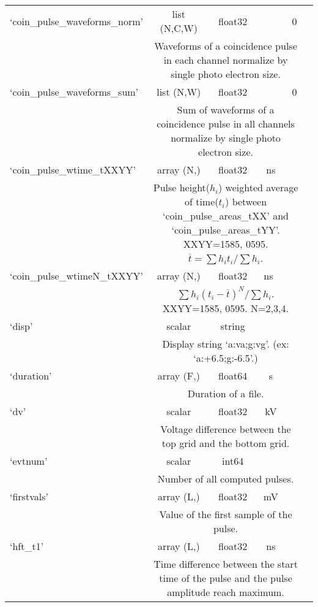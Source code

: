 \begin{center}
\begin{longtable}[!htbp]{|l||*{5}{c|}}
	 	`coin\_pulse\_waveforms\_norm' & list (N,C,W) & float32 &  & 0 \\\cline{2-6} & \multicolumn{4}{m{27em}|}{Waveforms of a coincidence pulse in each channel normalize by single photo electron size.}\\\hline
	 	`coin\_pulse\_waveforms\_sum' & list (N,W) & float32 &  & 0 \\\cline{2-6} & \multicolumn{4}{m{27em}|}{Sum of waveforms of a coincidence pulse in all channels normalize by single photo electron size.}\\\hline
	 	`coin\_pulse\_wtime\_tXXYY' & array (N,) & float32 & \si{\ns} & \si{\nan} \\\cline{2-6} & \multicolumn{4}{m{27em}|}{Pulse height($h_i$) weighted average of time($t_i$) between `coin\_pulse\_areas\_tXX' and `coin\_pulse\_areas\_tYY'. XXYY=1585, 0595. $\overline{t} = \sum h_i t_i /\sum h_i$. }\\\hline 
	 	`coin\_pulse\_wtimeN\_tXXYY' & array (N,) & float32 & \si{\ns\totheNth} & \si{\nan} \\\cline{2-6} & \multicolumn{4}{m{27em}|}{$\sum h_i (t_i-\overline{t})^{N} /\sum h_i$. XXYY=1585, 0595. N=2,3,4.}\\\hline 
	 	`disp' & scalar & string &  &  \\\cline{2-6} & \multicolumn{4}{m{27em}|}{Display string `a:va;g:vg'. (ex: `a:+6.5;g:-6.5'.)}\\\hline
	 	`duration' & array (F,) & float64 & \si{\s} &  \\\cline{2-6} & \multicolumn{4}{m{27em}|}{Duration of a file.}\\\hline
	 	`dv' & scalar & float32 & \si{\kV} &  \\\cline{2-6} & \multicolumn{4}{m{27em}|}{Voltage difference between the top grid and the bottom grid.}\\\hline
	 	`evtnum' & scalar & int64 & &  \\\cline{2-6} & \multicolumn{4}{m{27em}|}{Number of all computed pulses.}\\\hline
	 	`firstvals' & array (L,) & float32 & \si{\mV} &  \\\cline{2-6} & \multicolumn{4}{m{27em}|}{Value of the first sample of the pulse.}\\\hline
	 	`hft\_t1' & array (L,) & float32 & \si{\ns} &  \\\cline{2-6} & \multicolumn{4}{m{27em}|}{Time difference between the start time of the pulse and the pulse amplitude reach maximum.}\\\hline

\end{longtable}
\end{center}
